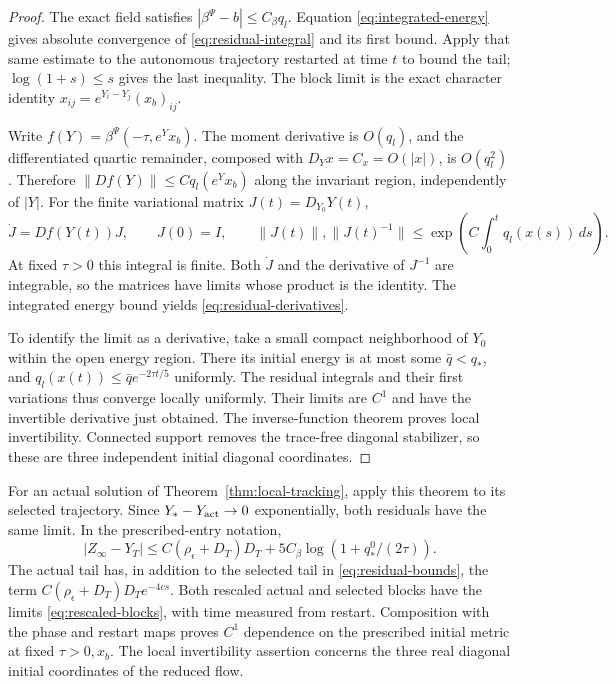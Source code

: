 \documentclass[11pt]{amsart}
\theoremstyle{definition}
\theoremstyle{remark}
\begin{document}
\begin{proof}
The exact field satisfies $|\beta^\Psi-b|\le C_\beta q_l$.
Equation \eqref{eq:integrated-energy} gives absolute convergence
of \eqref{eq:residual-integral} and its first bound.
Apply that same estimate to the autonomous trajectory
restarted at time $t$ to bound the tail; $\log(1+s)\le s$
gives the last inequality. The block limit is the exact
character identity $x_{ij}=e^{Y_i-Y_j}(x_b)_{ij}$.

Write $f(Y)=\beta^\Psi(-\tau,e^Yx_b)$. The moment derivative
is $O(q_l)$, and the differentiated quartic remainder,
composed with $D_Yx=C_x=O(|x|)$, is $O(q_l^2)$.
Therefore $\|Df(Y)\|\le Cq_l(e^Yx_b)$ along the invariant
region, independently of $|Y|$. For the finite variational
matrix $J(t)=D_{Y_0}Y(t)$,
\[
 \dot J=Df(Y(t))J,\qquad J(0)=I,\qquad
 \|J(t)\|,\|J(t)^{-1}\|
       \le\exp\!\left(C\int_0^tq_l(x(s))\,ds\right).
\]
At fixed $\tau>0$ this integral is finite. Both $\dot J$
and the derivative of $J^{-1}$ are integrable, so the
matrices have limits whose product is the identity.
The integrated energy bound yields
\eqref{eq:residual-derivatives}.

To identify the limit as a derivative, take a small compact
neighborhood of $Y_0$ within the open energy region.
There its initial energy is at most some $\bar q<q_*$,
and $q_l(x(t))\le\bar q e^{-2\tau t/5}$ uniformly.
The residual integrals and their first variations thus
converge locally uniformly. Their limits are $C^1$ and
have the invertible derivative just obtained. The
inverse-function theorem proves local invertibility.
Connected support removes the trace-free diagonal stabilizer,
so these are three independent initial diagonal coordinates.
\end{proof}

For an actual solution of Theorem~\ref{thm:local-tracking},
apply this theorem to its selected trajectory. Since
$Y_*-Y_{\rm act}\to0$ exponentially, both residuals have
the same limit. In the prescribed-entry notation,
\[
 |Z_\infty-Y_T|
 \le C(\rho_\epsilon+D_T)D_T
            +5C_\beta\log(1+q_*^0/(2\tau)).
\]
The actual tail has, in addition to the selected tail in
\eqref{eq:residual-bounds}, the term
$C(\rho_\epsilon+D_T)D_Te^{-4cs}$.
Both rescaled actual and selected blocks have the limits
\eqref{eq:rescaled-blocks}, with time measured from restart.
Composition with the phase and restart maps proves $C^1$
dependence on the prescribed initial metric at fixed
$\tau>0,x_b$. The local invertibility assertion concerns the
three real diagonal initial coordinates of the reduced flow.
\end{document}
